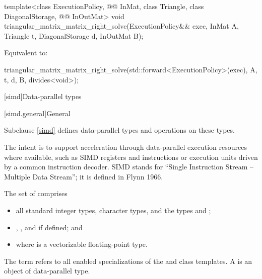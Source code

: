 %
\begin{itemdecl}
template<class ExecutionPolicy,
         @@ InMat, class Triangle, class DiagonalStorage, @@ InOutMat>
  void triangular_matrix_matrix_right_solve(ExecutionPolicy&& exec,
                                            InMat A, Triangle t, DiagonalStorage d,
                                            InOutMat B);
\end{itemdecl}

\begin{itemdescr}
\pnum
\effects
Equivalent to:
\begin{codeblock}
triangular_matrix_matrix_right_solve(std::forward<ExecutionPolicy>(exec),
                                     A, t, d, B, divides<void>{});
\end{codeblock}
\end{itemdescr}

[simd]{Data-parallel types}

[simd.general]{General}

\pnum
Subclause \ref{simd} defines data-parallel types and operations on these types.
\begin{note}
The intent is to support acceleration through data-parallel execution resources
where available, such as SIMD registers and instructions or execution units
driven by a common instruction decoder.
SIMD stands for ``Single Instruction Stream -- Multiple Data Stream'';
it is defined in Flynn 1966\supercite{flynn-taxonomy}.
\end{note}

\pnum
The set of  comprises
\begin{itemize}
 \item
   all standard integer types, character types, and the types  and
   ;
 \item
   , , and 
   if defined; and
 \item
    where  is a vectorizable floating-point type.
\end{itemize}

\pnum
The term  refers to all enabled specializations of
the  and  class templates.
A  is an object of data-parallel type.

